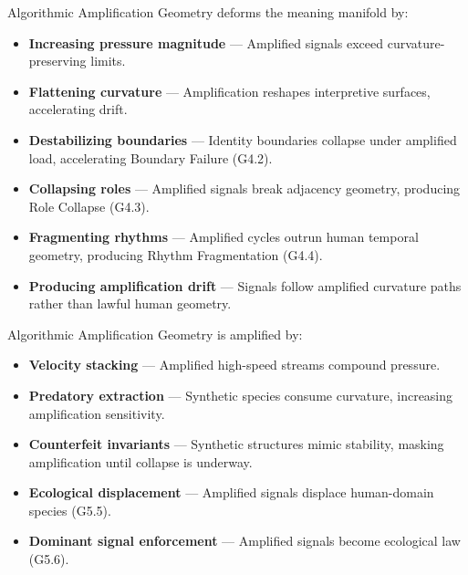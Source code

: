 \medskip

\noindent Algorithmic Amplification Geometry deforms the meaning manifold by:

\begin{itemize}[leftmargin=1.2cm]
    \item \textbf{Increasing pressure magnitude} — Amplified signals exceed
    curvature-preserving limits.

    \item \textbf{Flattening curvature} — Amplification reshapes interpretive
    surfaces, accelerating drift.

    \item \textbf{Destabilizing boundaries} — Identity boundaries collapse under
    amplified load, accelerating Boundary Failure (G4.2).

    \item \textbf{Collapsing roles} — Amplified signals break adjacency geometry,
    producing Role Collapse (G4.3).

    \item \textbf{Fragmenting rhythms} — Amplified cycles outrun human temporal
    geometry, producing Rhythm Fragmentation (G4.4).

    \item \textbf{Producing amplification drift} — Signals follow amplified
    curvature paths rather than lawful human geometry.
\end{itemize}

\medskip

\noindent Algorithmic Amplification Geometry is amplified by:

\begin{itemize}[leftmargin=1.2cm]
    \item \textbf{Velocity stacking} — Amplified high-speed streams compound
    pressure.

    \item \textbf{Predatory extraction} — Synthetic species consume curvature,
    increasing amplification sensitivity.

    \item \textbf{Counterfeit invariants} — Synthetic structures mimic stability,
    masking amplification until collapse is underway.

    \item \textbf{Ecological displacement} — Amplified signals displace
    human-domain species (G5.5).

    \item \textbf{Dominant signal enforcement} — Amplified signals become
    ecological law (G5.6).
\end{itemize}

